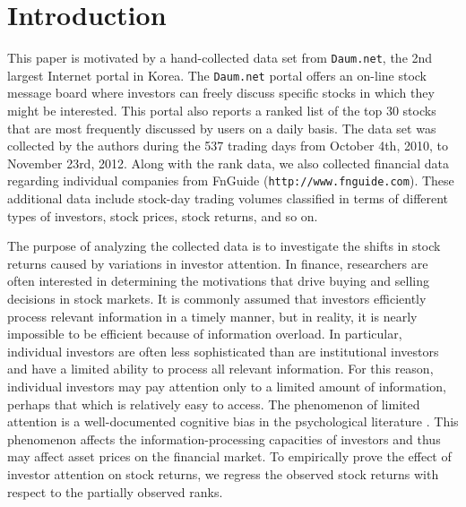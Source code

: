 \documentclass[12pt]{article}
\begin{document}
\baselineskip 24pt

\section{Introduction}

This paper is motivated by a hand-collected data set from \texttt{Daum.net}, the 
2nd largest Internet portal in Korea. The \texttt{Daum.net} portal
 offers an on-line stock message board where investors can
 freely discuss specific stocks in which they might be
 interested. This portal also reports
a ranked list of the top 30 stocks that are most frequently discussed by users on a daily basis. 
The data set was collected by the authors during the 537 trading days 
from October 4th, 2010, to November 23rd, 2012. Along with the rank data, we also 
collected financial data regarding individual companies from FnGuide 
(\texttt{http://www.fnguide.com}).  These additional data include stock-day trading volumes 
classified in terms of different types of investors, stock prices, stock returns, and so on.  



The purpose of analyzing the collected data is to investigate the shifts in stock returns caused by variations in
 investor attention. In finance, researchers are often interested in
 determining the motivations that drive buying and selling decisions in stock markets. It is commonly assumed that investors efficiently process
 relevant information in a timely manner, but in reality, it is nearly impossible to be efficient
because of information overload. In particular, individual investors are often less sophisticated 
than are institutional investors and have a limited ability to
process all relevant information. For this reason, individual investors may pay attention only to a limited amount 
of information, perhaps that which is relatively easy to access. The phenomenon of limited attention is a well-documented cognitive bias
 in the psychological literature
 \citep{Kahneman:1973,Camerer:2003}. This phenomenon affects the information-processing capacities of investors and thus may affect asset prices on the financial market. 
To empirically prove the 
effect of investor attention on stock returns, we regress the observed stock returns with respect to the partially observed ranks. 
\end{document}
